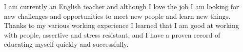 \documentclass{mycv}
\begin{document}
\begin{paracol}{3}

\vspace{10mm}


{\small{I am currently an English teacher and although I love the job I am looking for new challenges and opportunities to meet new people and learn new things. Thanks to my various working experience I learned that I am good at working with people, assertive and stress resistant, and I have a proven record of educating myself quickly and successfully.}
}

\vspace{10mm}

\switchcolumn
\switchcolumn



\vspace{4mm}


\end{paracol}
\end{document}
